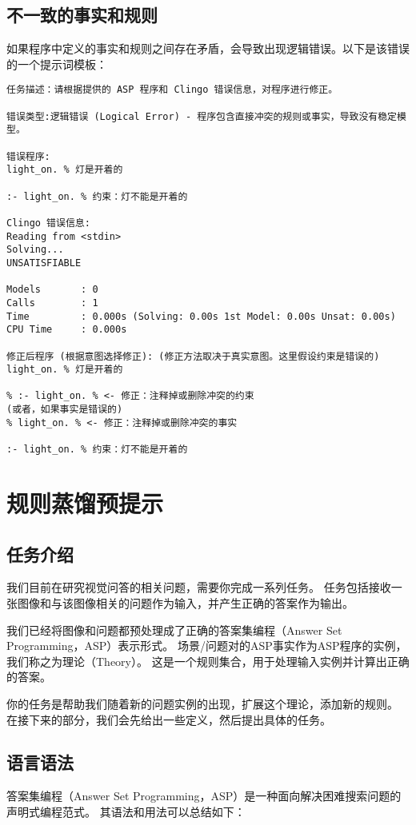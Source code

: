 \subsection{不一致的事实和规则}
如果程序中定义的事实和规则之间存在矛盾，会导致出现逻辑错误。以下是该错误的一个提示词模板：
\begin{lstlisting}
任务描述：请根据提供的 ASP 程序和 Clingo 错误信息，对程序进行修正。

错误类型:逻辑错误 (Logical Error) - 程序包含直接冲突的规则或事实，导致没有稳定模型。

错误程序:
light_on. % 灯是开着的

:- light_on. % 约束：灯不能是开着的

Clingo 错误信息:
Reading from <stdin>
Solving...
UNSATISFIABLE

Models       : 0
Calls        : 1
Time         : 0.000s (Solving: 0.00s 1st Model: 0.00s Unsat: 0.00s)
CPU Time     : 0.000s

修正后程序 (根据意图选择修正): (修正方法取决于真实意图。这里假设约束是错误的)
light_on. % 灯是开着的

% :- light_on. % <- 修正：注释掉或删除冲突的约束
(或者，如果事实是错误的)
% light_on. % <- 修正：注释掉或删除冲突的事实

:- light_on. % 约束：灯不能是开着的
\end{lstlisting}
\section{规则蒸馏预提示}
\label{appendix:preprompt}
\subsection{任务介绍}
\label{appendix:task-introduction}
我们目前在研究视觉问答的相关问题，需要你完成一系列任务。
任务包括接收一张图像和与该图像相关的问题作为输入，并产生正确的答案作为输出。

我们已经将图像和问题都预处理成了正确的答案集编程（Answer Set Programming，ASP）表示形式。
场景/问题对的ASP事实作为ASP程序的实例，我们称之为理论（Theory）。
这是一个规则集合，用于处理输入实例并计算出正确的答案。

你的任务是帮助我们随着新的问题实例的出现，扩展这个理论，添加新的规则。
在接下来的部分，我们会先给出一些定义，然后提出具体的任务。
\subsection{语言语法}
\label{appendix:asp-grammar}
答案集编程（Answer Set Programming，ASP）是一种面向解决困难搜索问题的声明式编程范式。
其语法和用法可以总结如下：

